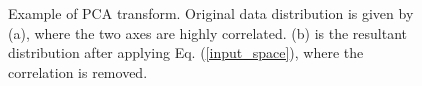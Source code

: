 \documentclass[journal]{IEEEtran}
\begin{document}
\begin{figure}[h]
\centering
{}
{}
\caption{Example of PCA transform. Original data distribution is given by (a), where the two axes are highly correlated. (b) is the resultant distribution after applying Eq. (\ref{input_space}), where the correlation is removed.}
\label{PCA_outcome}
\end{figure}
\end{document}
